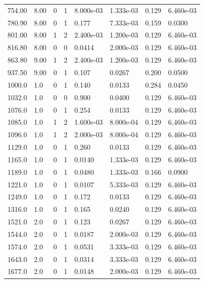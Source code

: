 \documentclass[preview]{standalone}
\begin{document}
{{\begin{tabular}{L{1.2cm}C{1.2cm} C{0.3cm}C{0.5cm} C{1.4cm}C{1.4cm} C{1.4cm}C{1.4cm}}
  754.00  &  8.00  & 0     &  1 &  8.000e-03  & 1.333e-03  & 0.129 &  6.460e-03   \\ 
  780.90  &  8.00  & 0     &  1 &  0.177  & 7.333e-03  & 0.159 &  0.0300   \\ 
  801.00  &  8.00  & 1     &  2 &  2.400e-03  & 1.200e-03  & 0.129 &  6.460e-03   \\ 
  816.80  &  8.00  & 0     &  0 &  0.0414  & 2.000e-03  & 0.129 &  6.460e-03   \\ 
  863.80  &  9.00  & 1     &  2 &  2.400e-03  & 1.200e-03  & 0.129 &  6.460e-03   \\ 
  937.50  &  9.00  & 0     &  1 &  0.107  & 0.0267  & 0.200 &  0.0500   \\ 
  1000.0  &   1.0  & 0     &  1 &  0.140  & 0.0133  & 0.284 &  0.0450   \\ 
  1032.0  &   1.0  & 0     &  0 &  0.900  & 0.0400  & 0.129 &  6.460e-03   \\ 
  1076.0  &   1.0  & 0     &  1 &  0.254  & 0.0133  & 0.129 &  6.460e-03   \\ 
  1085.0  &   1.0  & 1     &  2 &  1.600e-03  & 8.000e-04  & 0.129 &  6.460e-03   \\ 
  1096.0  &   1.0  & 1     &  2 &  2.000e-03  & 8.000e-04  & 0.129 &  6.460e-03   \\ 
  1129.0  &   1.0  & 0     &  1 &  0.260  & 0.0133  & 0.129 &  6.460e-03   \\ 
  1165.0  &   1.0  & 0     &  1 &  0.0140  & 1.333e-03  & 0.129 &  6.460e-03   \\ 
  1189.0  &   1.0  & 0     &  1 &  0.0480  & 1.333e-03  & 0.166 &  0.0900   \\ 
  1221.0  &   1.0  & 0     &  1 &  0.0107  & 5.333e-03  & 0.129 &  6.460e-03   \\ 
  1249.0  &   1.0  & 0     &  1 &  0.172  & 0.0133  & 0.129 &  6.460e-03   \\ 
  1316.0  &   1.0  & 0     &  1 &  0.165  & 0.0240  & 0.129 &  6.460e-03   \\ 
  1521.0  &   2.0  & 0     &  1 &  0.123  & 0.0267  & 0.129 &  6.460e-03   \\ 
  1544.0  &   2.0  & 0     &  1 &  0.0187  & 2.000e-03  & 0.129 &  6.460e-03   \\ 
  1574.0  &   2.0  & 0     &  1 &  0.0531  & 3.333e-03  & 0.129 &  6.460e-03   \\ 
  1643.0  &   2.0  & 0     &  1 &  0.0314  & 3.333e-03  & 0.129 &  6.460e-03   \\ 
  1677.0  &   2.0  & 0     &  1 &  0.0148  & 2.000e-03  & 0.129 &  6.460e-03   \\ 

\end{tabular}}}
\end{document}
